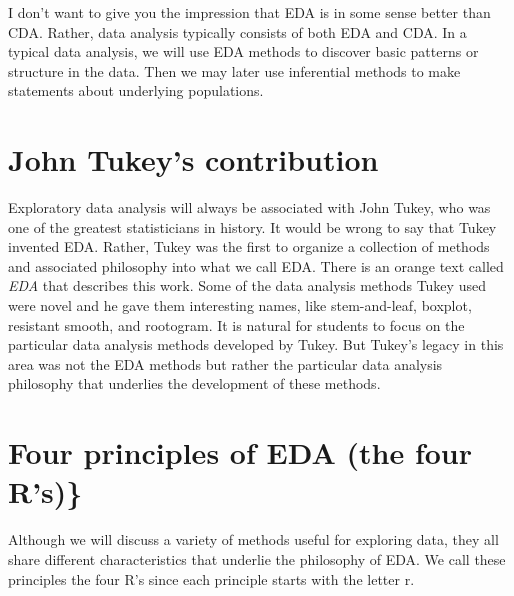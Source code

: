 \documentclass[
]{book}
\begin{document}
I don't want to give you the impression that EDA is in some sense better than CDA. Rather, data analysis typically consists of both EDA and CDA. In a typical data analysis, we will use EDA methods to discover basic patterns or structure in the data. Then we may later use inferential methods to make statements about underlying populations.

\hypertarget{john-tukeys-contribution}{%
\section{John Tukey's contribution}\label{john-tukeys-contribution}}

Exploratory data analysis will always be associated with John Tukey, who was one of the greatest statisticians in history. It would be wrong to say that Tukey invented EDA. Rather, Tukey was the first to organize a collection of methods and associated philosophy into what we call EDA. There is an orange text called \emph{EDA} that describes this work. Some of the data analysis methods Tukey used were novel and he gave them interesting names, like stem-and-leaf, boxplot, resistant smooth, and rootogram. It is natural for students to focus on the particular data analysis methods developed by Tukey. But Tukey's legacy in this area was not the EDA methods but rather the particular data analysis philosophy that underlies the development of these methods.

\hypertarget{four-principles-of-eda-the-four-rs}{%
\section{Four principles of EDA (the four R's)\}}\label{four-principles-of-eda-the-four-rs}}

Although we will discuss a variety of methods useful for exploring data, they all share different characteristics that underlie the philosophy of EDA. We call these principles the four R's since each principle starts with the letter r.
\end{document}
